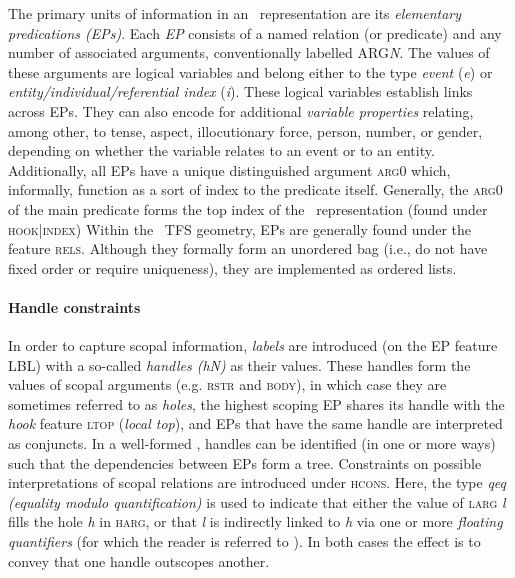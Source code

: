 The primary units of information in an \mrs\ representation are its
\emph{elementary predications (EPs)}. Each \emph{EP} consists of a named
relation (or predicate) and any number of associated arguments, conventionally
labelled ARG\emph{N}. The values of these arguments are logical variables and
belong either to the type \emph{event} (\emph{e}) or
\emph{entity/individual/referential index} (\emph{i}). These logical variables
establish links across EPs. They can also encode for additional \emph{variable
properties} relating, among other, to tense, aspect, illocutionary force,
person, number, or gender, depending on whether the variable relates to an
event or to an entity. Additionally, all EPs have a unique distinguished
argument \textsc{arg0} which, informally, function as a sort of index to the
predicate itself. Generally, the \textsc{arg0} of the main predicate forms the
top index of the \mrs\ representation (found under \textsc{hook|index}) Within
the \delphin\ TFS geometry, EPs are generally found under the feature
\textsc{rels}. Although they formally form an unordered bag (i.e., do not have
fixed order or require uniqueness), they are implemented as ordered lists.

\paragraph{Handle constraints}

In order to capture scopal information, \emph{labels} are introduced (on the EP
feature \textsc{LBL}) with a so-called \emph{handles (hN)} as their values.
These handles form the values of scopal arguments (e.g. \textsc{rstr} and
\textsc{body}), in which case they are sometimes referred to as \emph{holes},
the highest scoping EP shares its handle with the \emph{hook} feature
\textsc{ltop} (\emph{local top}), and EPs that have the same handle are
interpreted as conjuncts.  In a well-formed \mrs, handles can be identified (in
one or more ways) such that the dependencies between EPs form a tree. Constraints on possible interpretations of scopal relations are introduced under \textsc{hcons}. Here, the type \emph{qeq (equality modulo quantification)} is used to indicate that either the value of \textsc{larg} \emph{l} fills the hole \emph{h} in \textsc{harg}, or that \emph{l} is indirectly linked to \emph{h} via one or more \emph{floating quantifiers} (for which the reader is referred to \citet{copestake2005minimal}). In both cases the effect is to convey that one handle outscopes another.

